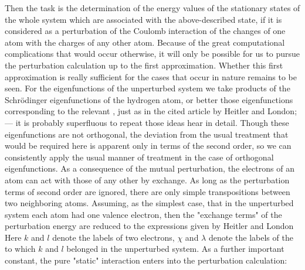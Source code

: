 \begin{paper}{1}
Then the task is the determination of the energy values of the stationary states of the whole system which are associated with the above-described state, if it is considered as a perturbation of the Coulomb interaction of the changes of one atom with the charges of any other atom. Because of the great computational complications that would occur otherwise, it will only be possible for us to pursue the perturbation calculation up to the first approximation. Whether this first approximation is really sufficient for the cases that occur in nature remains to be seen. For the eigenfunctions of the unperturbed system we take products of the Schr\"odinger eigenfunctions of the hydrogen atom, or better those eigenfunctions corresponding to the relevant , just as in the cited article by Heitler and London; — it is probably superfluous to repeat those ideas hear in detail. Though these eigenfunctions are not orthogonal, the deviation from the usual treatment that would be required here is apparent only in terms of the second order, so we can consistently apply the usual manner of treatment in the case of orthogonal eigenfunctions. As a consequence of the mutual perturbation, the electrons of an atom can act with those of any other by exchange. As long as the perturbation terms of second order are ignored, there are only simple transpositions between two neighboring atoms. Assuming, as the simplest case, that in the unperturbed system each atom had one valence electron, then the "exchange terms" of the perturbation energy are reduced to the expressions given by Heitler and London
Here $k$ and $l$ denote the labels of two electrons, $\chi$ and $\lambda$ denote the labels of the  to which $k$ and $l$ belonged in the unperturbed system.  As a further important constant, the pure "static" interaction enters into the perturbation calculation:


\end{paper}
